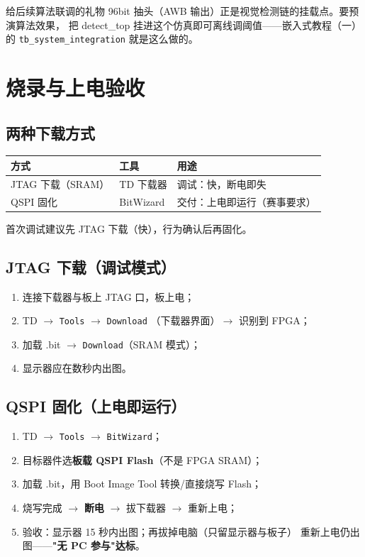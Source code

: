 \documentclass[11pt]{ctexart}
\newcommand{\code}[1]{\texttt{#1}}
\begin{document}
\begin{tipbox}{给后续算法联调的礼物}
96bit 抽头（AWB 输出）正是视觉检测链的挂载点。要预演算法效果，
把 detect\_top 挂进这个仿真即可离线调阈值——嵌入式教程（一）的
\code{tb\_system\_integration} 就是这么做的。
\end{tipbox}

\section{烧录与上电验收}

\subsection{两种下载方式}

\begin{center}
\begin{tabular}{lll}
\toprule
\rowcolor{rowtint}\textbf{方式} & \textbf{工具} & \textbf{用途} \\
\midrule
JTAG 下载（SRAM） & TD 下载器 & 调试：快，断电即失 \\
QSPI 固化 & BitWizard & 交付：上电即运行（赛事要求） \\
\bottomrule
\end{tabular}
\end{center}

首次调试建议先 JTAG 下载（快），行为确认后再固化。

\subsection{JTAG 下载（调试模式）}

\begin{enumerate}
  \item 连接下载器与板上 JTAG 口，板上电；
  \item TD $\rightarrow$ \code{Tools} $\rightarrow$ \code{Download}
        （下载器界面）$\rightarrow$ 识别到 FPGA；
  \item 加载 .bit $\rightarrow$ \code{Download}（SRAM 模式）；
  \item 显示器应在数秒内出图。
\end{enumerate}

\subsection{QSPI 固化（上电即运行）}

\begin{enumerate}
  \item TD $\rightarrow$ \code{Tools} $\rightarrow$ \code{BitWizard}；
  \item 目标器件选\textbf{板载 QSPI Flash}（不是 FPGA SRAM）；
  \item 加载 .bit，用 Boot Image Tool 转换/直接烧写 Flash；
  \item 烧写完成 $\rightarrow$ \textbf{断电} $\rightarrow$ 拔下载器
        $\rightarrow$ 重新上电；
  \item 验收：显示器 15 秒内出图；再拔掉电脑（只留显示器与板子）
        重新上电仍出图——\textbf{"无 PC 参与"达标}。
\end{enumerate}
\end{document}
